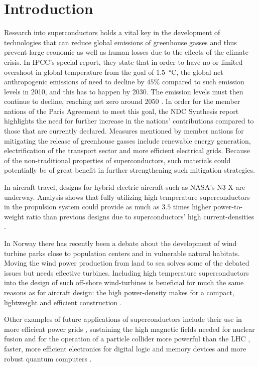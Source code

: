 \chapter{Introduction}\noindent
%
%
Research into superconductors holds a vital key in the development of technologies that can reduce global emissions of greenhouse gasses
and thus prevent large economic as well as human losses due to the effects of the climate crisis.
In IPCC's special report, they state that in order to have no or limited overshoot in global temperature from the goal of \SI{1.5}{\degreeCelsius},
the global net anthropogenic emissions of  need to decline by $45\%$ compared to such emission levels in 2010, and this has to happen
by 2030. The emission levels must then continue to decline, reaching net zero around 2050 \cite{Allen18}.
In order for the member nations of the Paris Agreement to meet this goal, the NDC Synthesis report \cite{NDC21} highlights the need for further
increase in the nations' contributions compared to those that are currently declared. Measures mentioned by member nations for mitigating the
release of greenhouse gasses include renewable energy generation, electrification of the transport sector and more efficient electrical grids.
Because of the non-traditional properties of superconductors, such materials could potentially be of great benefit in further strengthening
such mitigation strategies.

In aircraft travel, designs for hybrid electric aircraft such as NASA's N3-X are underway. Analysis shows that fully utilizing high temperature
superconductors in the propulsion system could provide as much as $3.5$ times higher power-to-weight ratio than previous designs due to
superconductors' high current-densities \cite{Corduan20}.

In Norway there has recently been a debate about the development of wind turbine parks close to population centers and in vulnerable natural
habitats. Moving the wind power production from land to sea solves some of the debated issues but needs effective turbines. Including high
temperature superconductors into the design of such off-shore wind-turbines is beneficial for much the same reasons as for aircraft design:
the high power-density makes for a compact, lightweight and efficient construction \cite{Cheng21, Liu18}.

Other examples of future applications of superconductors include their use in more efficient power grids \cite{Tixador19, Stemmle14}, sustaining the high
magnetic fields needed for nuclear fusion \cite{Hartwig20, Whyte19} and for the operation of a particle collider more powerful than the
LHC \cite{Mentink18}, faster, more efficient electronics for digital logic and memory devices and more robust quantum computers \cite{Bommer19}.

